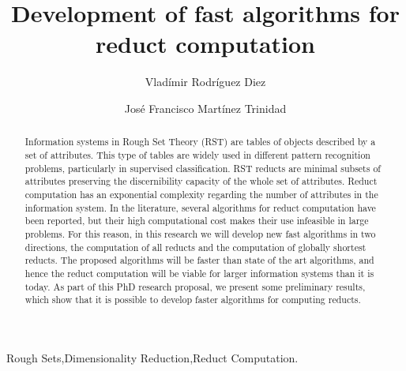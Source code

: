 \documentclass[authoryear,11pt]{elsarticle}
\begin{document}
	
	
	\title{Development of fast algorithms for reduct computation}
	
	\author{Vlad\'imir Rodr\'iguez Diez}
	\author{Jos\'e Francisco Mart\'inez Trinidad}
	
	\address{Computer Science Department\\National Institute of
	Astrophysics, Optics and Electronics\\
	Luis Enrique Erro \# 1, Santa Mar\'{\i}a Tonantzintla, Puebla,
	72840, M\'{e}xico} 
	
	
	
	\begin{abstract}
		Information systems in Rough Set Theory (RST) are tables of objects described by a set of attributes. 
		This type of tables are widely used in different pattern recognition problems, particularly in 
		supervised classification. RST reducts are minimal subsets of attributes preserving 
		the discernibility capacity of the whole set of attributes. Reduct computation has an exponential
		complexity regarding the number of attributes in the information system. In the literature, several
		algorithms for reduct computation have been reported, but their high computational cost makes 
		their use infeasible in large problems. For this reason, in this research we will develop new fast
		algorithms in two directions, the computation of all reducts and the computation of globally 
		shortest reducts. The proposed algorithms will be faster than state of the art algorithms, and hence 
		the reduct computation will be viable for larger information systems than it is today. As part of this 
		PhD research proposal, we present some preliminary results, which show that it is possible to develop
		faster algorithms for computing reducts.
	\end{abstract}
	
	\begin{keyword}
		Rough Sets\sep Dimensionality Reduction\sep Reduct Computation.
	\end{keyword}

	\maketitle

\pagebreak 
\tableofcontents
\pagebreak 

\end{document}
